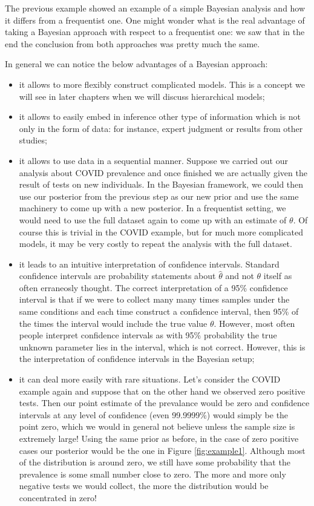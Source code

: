\documentclass[
]{book}
\begin{document}
The previous example showed an example of a simple Bayesian analysis and how it differs from a frequentist one. One might wonder what is the real advantage of taking a Bayesian approach with respect to a frequentist one: we saw that in the end the conclusion from both approaches was pretty much the same.

In general we can notice the below advantages of a Bayesian approach:

\begin{itemize}
\item
  it allows to more flexibly construct complicated models. This is a concept we will see in later chapters when we will discuss hierarchical models;
\item
  it allows to easily embed in inference other type of information which is not only in the form of data: for instance, expert judgment or results from other studies;
\item
  it allows to use data in a sequential manner. Suppose we carried out our analysis about COVID prevalence and once finished we are actually given the result of tests on new individuals. In the Bayesian framework, we could then use our posterior from the previous step as our new prior and use the same machinery to come up with a new posterior. In a frequentist setting, we would need to use the full dataset again to come up with an estimate of \(\theta\). Of course this is trivial in the COVID example, but for much more complicated models, it may be very costly to repeat the analysis with the full dataset.
\item
  it leads to an intuitive interpretation of confidence intervals. Standard confidence intervals are probability statements about \(\hat\theta\) and not \(\theta\) itself as often erraneosly thought. The correct interpretation of a 95\% confidence interval is that if we were to collect many many times samples under the same conditions and each time construct a confidence interval, then 95\% of the times the interval would include the true value \(\theta\). However, most often people interpret confidence intervals as with 95\% probability the true unknown parameter lies in the interval, which is not correct. However, this is the interpretation of confidence intervals in the Bayesian setup;
\item
  it can deal more easily with rare situations. Let's consider the COVID example again and suppose that on the other hand we observed zero positive tests. Then our point estimate of the prevalance would be zero and confidence intervals at any level of confidence (even 99.9999\%) would simply be the point zero, which we would in general not believe unless the sample size is extremely large! Using the same prior as before, in the case of zero positive cases our posterior would be the one in Figure \ref{fig:example1}. Although most of the distribution is around zero, we still have some probability that the prevalence is some small number close to zero. The more and more only negative tests we would collect, the more the distribution would be concentrated in zero!
\end{itemize}
\end{document}
